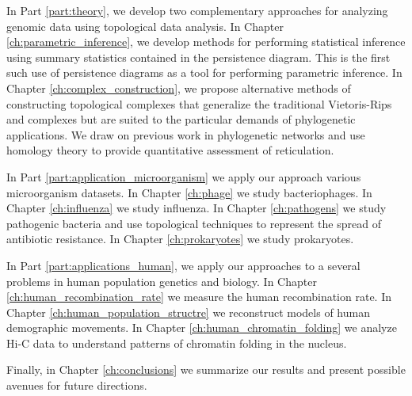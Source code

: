 In Part \ref{part:theory}, we develop two complementary approaches for analyzing genomic data using topological data analysis.
In Chapter \ref{ch:parametric_inference}, we develop methods for performing statistical inference using summary statistics contained in the persistence diagram.
This is the first such use of persistence diagrams as a tool for performing parametric inference.
In Chapter \ref{ch:complex_construction}, we propose alternative methods of constructing topological complexes that generalize the traditional Vietoris-Rips and \Cech complexes but are suited to the particular demands of phylogenetic applications.
We draw on previous work in phylogenetic networks and use homology theory to provide quantitative assessment of reticulation.

In Part \ref{part:application_microorganism} we apply our approach various microorganism datasets.
In Chapter \ref{ch:phage} we study bacteriophages.
In Chapter \ref{ch:influenza} we study influenza.
In Chapter \ref{ch:pathogens} we study pathogenic bacteria and use topological techniques to represent the spread of antibiotic resistance.
In Chapter \ref{ch:prokaryotes} we study prokaryotes.

In Part \ref{part:applications_human}, we apply our approaches to a several problems in human population genetics and biology.
In Chapter \ref{ch:human_recombination_rate} we measure the human recombination rate.
In Chapter \ref{ch:human_population_structre} we reconstruct models of human demographic movements.
In Chapter \ref{ch:human_chromatin_folding} we analyze Hi-C data to understand patterns of chromatin folding in the nucleus.

Finally, in Chapter \ref{ch:conclusions} we summarize our results and present possible avenues for future directions.